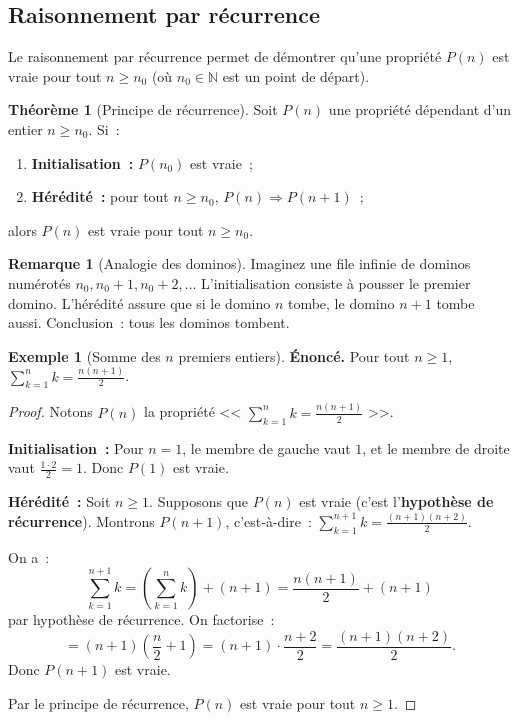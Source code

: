 \documentclass[12pt,a4paper,openany]{book}
\theoremstyle{definition}
\newtheorem{theoreme}{Théorème}[chapter]
\newtheorem{remarque}{Remarque}[chapter]
\newtheorem{exemple}{Exemple}[chapter]
\newcommand{\N}{\mathbb{N}}
\begin{document}
\subsection{Raisonnement par récurrence}
\label{subsec:recurrence}

Le raisonnement par récurrence permet de démontrer qu'une propriété $P(n)$ est vraie pour tout $n \geq n_0$ (où $n_0 \in \N$ est un point de départ).

\begin{theoreme}[Principe de récurrence]\label{thm:recurrence}
  Soit $P(n)$ une propriété dépendant d'un entier $n \geq n_0$. Si~:
  \begin{enumerate}[label=(\roman*)]
    \item \textbf{Initialisation~:} $P(n_0)$ est vraie~;
    \item \textbf{Hérédité~:} pour tout $n \geq n_0$, $P(n) \Rightarrow P(n+1)$~;
  \end{enumerate}
  alors $P(n)$ est vraie pour tout $n \geq n_0$.
\end{theoreme}

\begin{remarque}[Analogie des dominos]\label{rem:dominos}
  Imaginez une file infinie de dominos numérotés $n_0, n_0+1, n_0+2, \ldots$ L'initialisation consiste à pousser le premier domino. L'hérédité assure que si le domino $n$ tombe, le domino $n+1$ tombe aussi. Conclusion~: tous les dominos tombent.
\end{remarque}

\begin{exemple}[Somme des $n$ premiers entiers]\label{ex:somme-entiers}
  \textbf{Énoncé.} Pour tout $n \geq 1$, $\displaystyle\sum_{k=1}^{n} k = \frac{n(n+1)}{2}$.

  \begin{proof}
    Notons $P(n)$ la propriété << $\sum_{k=1}^{n} k = \frac{n(n+1)}{2}$ >>.

    \textbf{Initialisation~:} Pour $n = 1$, le membre de gauche vaut $1$, et le membre de droite vaut $\frac{1 \cdot 2}{2} = 1$. Donc $P(1)$ est vraie.

    \textbf{Hérédité~:} Soit $n \geq 1$. Supposons que $P(n)$ est vraie (c'est l'\textbf{hypothèse de récurrence}). Montrons $P(n+1)$, c'est-à-dire~: $\sum_{k=1}^{n+1} k = \frac{(n+1)(n+2)}{2}$.

    On a~:
    \[
      \sum_{k=1}^{n+1} k = \left(\sum_{k=1}^{n} k\right) + (n+1) = \frac{n(n+1)}{2} + (n+1)
    \]
    par hypothèse de récurrence. On factorise~:
    \[
      = (n+1)\left(\frac{n}{2} + 1\right) = (n+1) \cdot \frac{n+2}{2} = \frac{(n+1)(n+2)}{2}.
    \]
    Donc $P(n+1)$ est vraie.

    Par le principe de récurrence, $P(n)$ est vraie pour tout $n \geq 1$.
  \end{proof}
\end{exemple}
\end{document}
